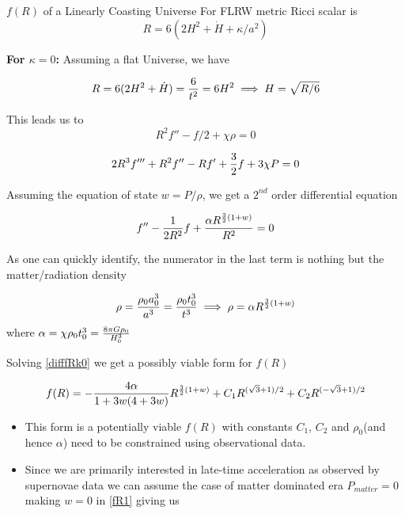 \documentclass[final,hyperref={pdfpagelabels=false}]{beamer}
\begin{document}
\begin{frame}[t]
\begin{columns}[t]
\begin{column}{.465\textwidth}
\begin{block}{$f(R)$ of a Linearly Coasting Universe}
For FLRW metric Ricci scalar is
\begin{equation}
R=6(2H^2+\dot{H}+\kappa/a^2) 
\end{equation}

\textbf{For $\kappa=0$:}
Assuming a flat Universe, we have 

\begin{equation}
R=6(2H^2+\dot{H}) = {6 \over t^2} = 6H^2 \implies H=\sqrt{R/6}\label{Rk0}
\end{equation}


This leads us to 
\begin{equation}
R^2f''-f/2+\chi\rho=0\label{fR1k0}
\end{equation}

\begin{equation}
2R^3f'''+R^2f''-Rf'+{3 \over 2}f+3\chi P =0\label{fR2k0}
\end{equation}

Assuming the equation of state $w=P/\rho$, we get a $2^{nd}$ order differential equation

\begin{equation}
f''-{1\over 2R^2}f+{\alpha R^{{3 \over 2}(1+w)}\over R^2}=0\label{difffRk0}
\end{equation}

As one can quickly identify, the numerator in the last term is nothing but the matter/radiation density 

\begin{equation}
\rho = {\rho_0 a_0^3 \over a^3} = {\rho_0 t_0^3 \over t^3} \implies \rho = \alpha R^{{3 \over 2}(1+w)}
\end{equation}
where $\alpha = \chi\rho_0 t_0^3= {8\pi G\rho_0 \over H_0^3}$

Solving \eqref{difffRk0} we get a possibly viable form for $f(R)$

\begin{equation}
f(R)=-{4\alpha \over 1 + 3 w (4 + 3 w)} R^{{3 \over 2}(1+w)}+C_1R^{(\sqrt{3}+1)/2}+C_2R^{(-\sqrt{3}+1)/2}\label{fR1}
\end{equation}
\begin{itemize}
	\item This form is a potentially viable $f(R)$ with constants $C_1$, $C_2$ and $\rho_0$(and hence $\alpha$) need to be constrained using observational data.
	\item Since we are primarily interested in late-time acceleration as observed by supernovae data we can assume the case of matter dominated era  $P_{matter}=0$ making $w=0$ in \eqref{fR1} giving us
\end{itemize}


\end{block}
\end{column}
\end{columns}
\end{frame}
\end{document}
